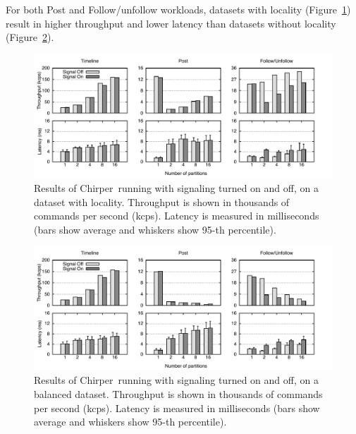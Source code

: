 \documentclass[11pt]{article}
\newcommand{\appname}{Chirper} %
\begin{document}
For both Post and Follow/unfollow workloads, datasets with locality (Figure~\ref{fig:perf2}) result in higher throughput and lower latency than datasets without locality (Figure~\ref{fig:perf1}).

\begin{figure}[h]
\begin{minipage}[b]{1\linewidth} %
\centering
      \includegraphics[width=1\linewidth]{figures/sc-at-scale-locality}
\end{minipage}
\caption{Results of \appname\ running with signaling turned on and off, on a dataset with locality. Throughput is shown in thousands of commands per second (kcps). Latency is measured in milliseconds (bars show average and whiskers show 95-th percentile).}
\label{fig:perf2}
\end{figure}

\begin{figure}[h]
\begin{minipage}[b]{1\linewidth} %
\centering
      \includegraphics[width=1\linewidth]{figures/sc-at-scale-balance}
\end{minipage}
\caption{Results of \appname\ running with signaling turned on and off, on a balanced dataset. Throughput is shown in thousands of commands per second (kcps). Latency is measured in milliseconds (bars show average and whiskers show 95-th percentile).}
\label{fig:perf1}
\end{figure}
\end{document}
